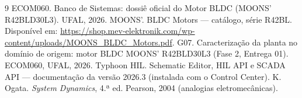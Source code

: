 \documentclass[10pt,a4paper]{article}
\begin{document}
\begin{thebibliography}{9}\small
{} ECOM060. Banco de Sistemas: dossiê oficial do Motor BLDC (MOONS' R42BLD30L3). UFAL, 2026.
 MOONS'. BLDC Motors — catálogo, série R42BL. Disponível em: \url{https://shop.mev-elektronik.com/wp-content/uploads/MOONS_BLDC_Motors.pdf}.
 G07. Caracterização da planta no domínio de origem: motor BLDC MOONS' R42BLD30L3 (Fase 2, Entrega 01). ECOM060, UFAL, 2026.
 Typhoon HIL. Schematic Editor, HIL API e SCADA API — documentação da versão 2026.3 (instalada com o Control Center).
 K. Ogata. \emph{System Dynamics}, 4.ª ed. Pearson, 2004 (analogias eletromecânicas).
\end{thebibliography}
\end{document}
